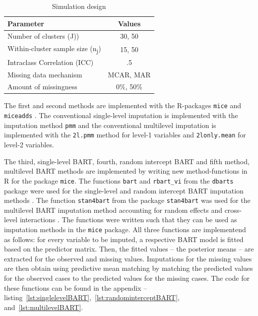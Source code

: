 \documentclass[10pt, a4paper, titlepage]{article}
\begin{document}
\begin{table}
\centering
\caption{Simulation design}
\label{tab:simulationparameters}
\begin{tabular}{l|c}
        \textbf{Parameter}                                  & \textbf{Values} \\ \hline
        Number of clusters (J))                             & 30, 50 \\
        Within-cluster sample size (n\textsubscript{j})     & 15, 50 \\
        Intraclass Correlation (ICC)                        & .5 \\
        Missing data mechanism                              & MCAR, MAR \\
        Amount of missingness                               & 0\%, 50\%
\end{tabular}
\end{table} The first and second methods are implemented with the R-packages \texttt{mice} and \texttt{miceadds} \citep{robitzsch2024}. The conventional single-level imputation is implemented with the imputation method \texttt{pmm} and the conventional multilevel imputation is implemented with the \texttt{2l.pmm} method for level-1 variables and \texttt{2lonly.mean} for level-2 variables.

The third, single-level BART, fourth, random intercept BART and fifth method, multilevel BART methods are implemented by writing new method-functions in R \citep{rcoreteam2023} for the package \texttt{mice}. The functions \texttt{bart} and \texttt{rbart\_vi} from the \texttt{dbarts} package were used for the single-level and random intercept BART imputation methods \citep{dorie2024}. The function \texttt{stan4bart} from the package \texttt{stan4bart} was used for the multilevel BART imputation method accounting for random effects and cross-level interactions \citep{dorie2023a}. The functions were written such that they can be used as imputation methods in the \texttt{mice} package. All three functions are implementend as follows: for every variable to be imputed, a respective BART model is fitted based on the predictor matrix. Then, the fitted values -- the posterior means -- are extracted for the observed and missing values. Imputations for the missing values are then obtain using predictive mean matching by matching the predicted values for the observed cases to the predicted values for the missing cases. The code for these functions can be found in the appendix -- listing~\ref{lst:singlelevelBART},~\ref{lst:randominterceptBART}, and~\ref{lst:multilevelBART}.
\end{document}
